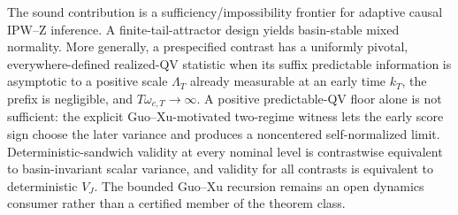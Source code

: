 The sound contribution is a sufficiency/impossibility frontier for adaptive causal IPW--Z inference. A finite-tail-attractor design yields basin-stable mixed normality. More generally, a prespecified contrast has a uniformly pivotal, everywhere-defined realized-QV statistic when its suffix predictable information is asymptotic to a positive scale \(\Lambda_T\) already measurable at an early time \(k_T\), the prefix is negligible, and \(T\omega_{c,T}\to\infty\). A positive predictable-QV floor alone is not sufficient: the explicit Guo--Xu-motivated two-regime witness lets the early score sign choose the later variance and produces a noncentered self-normalized limit. Deterministic-sandwich validity at every nominal level is contrastwise equivalent to basin-invariant scalar variance, and validity for all contrasts is equivalent to deterministic \(V_J\). The bounded Guo--Xu recursion remains an open dynamics consumer rather than a certified member of the theorem class.